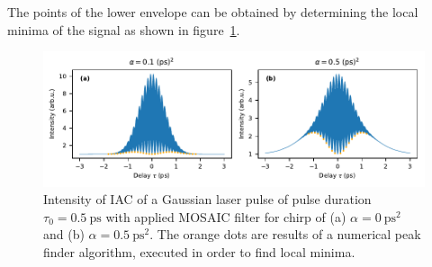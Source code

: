\newpage

The points of the lower envelope can be obtained by determining the local minima of the signal as shown in figure~\ref{fig:mosaicchirpedlaserpulsefindenvelope}.

\begin{figure}[H]
	\centering
	\includegraphics[width=\linewidth]{figures/chirp/plots/mosaic_chirped_laser_pulse_find_envelope}
	\caption{Intensity of IAC of a Gaussian laser pulse of pulse duration $\tau_0=\SI{0.5}{\pico \second}$ with applied MOSAIC filter for chirp of (a) $\alpha = \SI{0}{\pico \second \squared}$ and (b) $\alpha = \SI{0.5}{\pico \second \squared}$.
		The orange dots are results of a numerical peak finder algorithm, executed in order to find local minima.}
	\label{fig:mosaicchirpedlaserpulsefindenvelope}
\end{figure}

